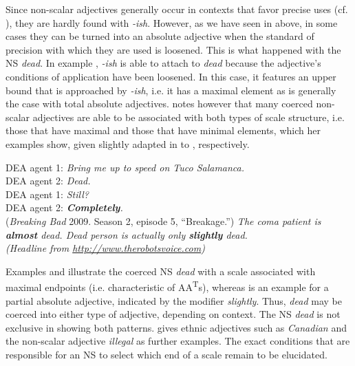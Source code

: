 \documentclass[output=paper]{langsci/langscibook}
\begin{document}
Since non-scalar adjectives generally occur in contexts that favor precise uses (cf. \citealt[95--96]{Burnett2017}), they are hardly found with \textit{-ish}. However, as we have seen in  above, in some cases they can be turned into an absolute adjective when the standard of precision with which they are used is loosened. This is what happened with the NS \textit{dead}. In example , \textit{-ish} is able to attach to \textit{dead} because the adjective's conditions of application have been loosened. In this case, it features an upper bound that is approached by \textit{-ish}, i.e. it has a maximal element as is generally the case with total absolute adjectives. \textcite[112--113]{Burnett2017} notes however that many coerced non-scalar adjectives are able to be associated with both types of scale structure, i.e. those that have maximal and those that have minimal elements, which her examples show, given slightly adapted in  to , respectively.

\ea\label{ex:harris:30}
	    DEA agent 1: \textit{Bring me up to speed on Tuco Salamanca.}\\
		DEA agent 2: \textit{Dead.}\\
		DEA agent 1: \textit{Still?}\\
		DEA agent 2: \textit{\textbf{Completely}.}\\
		(\textit{Breaking Bad} 2009. Season 2, episode 5, ``Breakage.'')
\ex\label{ex:harris:31}
	\itshape The coma patient is \textbf{almost} dead.
\ex\label{ex:harris:32}
	{\itshape Dead person is actually only \textbf{slightly} dead.}\\
		(Headline from \url{http://www.therobotsvoice.com})
\z

Examples  and  illustrate the coerced NS \textit{dead} with a scale associated with maximal endpoints (i.e. characteristic of AA\textsuperscript{T}s), whereas  is an example for a partial absolute adjective, indicated by the modifier \textit{slightly}. Thus, \textit{dead} may be coerced into either type of adjective, depending on context. The NS \textit{dead} is not exclusive in showing both patterns. \textcite[113]{Burnett2017} gives ethnic adjectives such as \textit{Canadian} and the non-scalar adjective \textit{illegal} as further examples. The exact conditions that are responsible for an NS to select which end of a scale remain to be elucidated.
\end{document}
